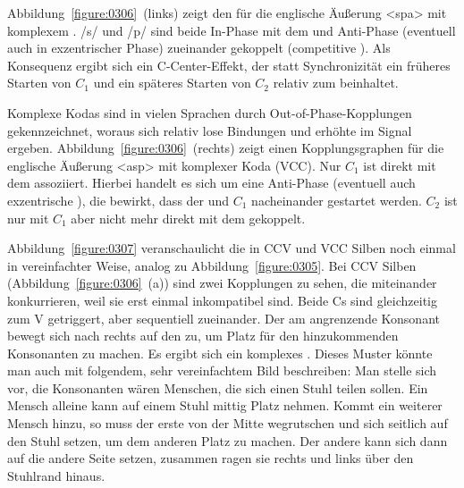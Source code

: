 Abbildung~\ref{figure:0306}~(links) zeigt den  für die englische Äußerung <spa> mit komplexem . /s/ und /p/ sind beide In-Phase mit dem  und Anti-Phase (eventuell auch in exzentrischer Phase) zueinander gekoppelt (competitive ). Als Konsequenz ergibt sich ein C-Center-Effekt, der statt Synchronizität ein früheres Starten von ${C}_{1}$ und ein späteres Starten von ${C}_{2}$ relativ zum  beinhaltet.


Komplexe Kodas sind in vielen Sprachen durch Out-of-Phase-Kopplungen gekennzeichnet, woraus sich relativ lose Bindungen und erhöhte  im Signal ergeben. Abbildung~\ref{figure:0306}~(rechts) zeigt einen Kopplungsgraphen für die englische Äußerung <asp> mit komplexer Koda (VCC). Nur ${C}_{1}$ ist direkt mit dem  assoziiert. Hierbei handelt es sich um eine Anti-Phase  (eventuell auch exzentrische ), die bewirkt, dass der  und ${C}_{1}$ nacheinander gestartet werden. ${C}_{2}$ ist nur mit ${C}_{1}$ aber nicht mehr direkt mit dem  gekoppelt. 


\largerpage
Abbildung~\ref{figure:0307} veranschaulicht die  in CCV und VCC Silben noch einmal in vereinfachter Weise, analog zu Abbildung~\ref{figure:0305}. Bei CCV Silben (Abbildung~\ref{figure:0306}~(a)) sind zwei Kopplungen zu sehen, die miteinander konkurrieren, weil sie erst einmal inkompatibel sind. Beide Cs sind gleichzeitig zum V getriggert, aber sequentiell zueinander. Der am  angrenzende Konsonant bewegt sich nach rechts auf den  zu, um Platz für den hinzukommenden Konsonanten zu machen. Es ergibt sich ein komplexes . Dieses Muster könnte man auch mit folgendem, sehr vereinfachtem Bild beschreiben: Man stelle sich vor, die Konsonanten wären Menschen, die sich einen Stuhl teilen sollen. Ein Mensch alleine kann auf einem Stuhl mittig Platz nehmen. Kommt ein weiterer Mensch hinzu, so muss der erste von der Mitte wegrutschen und sich seitlich auf den Stuhl setzen, um dem anderen Platz zu machen. Der andere kann sich dann auf die andere Seite setzen, zusammen ragen sie rechts und links über den Stuhlrand hinaus. 


